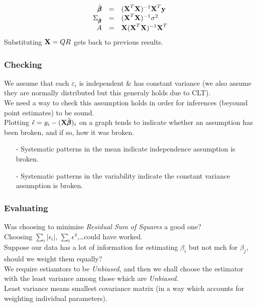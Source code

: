 \documentclass[11pt,a4paper]{article}
\begin{document}
\[\begin{array}{rcl}
\hat{\pmb\beta}&=&(\textbf{X}^T\textbf{X})^{-1}\textbf{X}^T\textbf{y}\\
\Sigma_{\hat{\pmb\beta}}&=&(\textbf{X}^T\textbf{X})^{-1}\sigma^2\\
A&=&\textbf{X}(\textbf{X}^T\textbf{X})^{-1}\textbf{X}^T
\end{array}\]
\nb Substituting $\textbf{X}=QR$ gets back to previous results.

\subsubsection{Checking}

We assume that each $\varepsilon_i$ is independent \& has constant variance (we also assume they are normally distributed but this generaly holds due to CLT).\\
We need a way to check this assumption holds in order for inferences (beyound point estimates) to be sound.\\

Plotting $\hat\epsilon=y_i-(\textbf{X}\hat{\pmb\beta})_i$ on a graph tends to indicate whether an assumption has been broken, and if so, how it was broken.
\begin{itemize}
	\item[-] Systematic patterns in the mean indicate independence assumption is broken.
	\item[-] Systematic patterns in the variability indicate the constant variance assumption is broken.
\end{itemize}

\subsubsection{Evaluating}

Was choosing to minimise \textit{Residual Sum of Squares} a good one?\\
\nb Choosing $\sum_i|\epsilon_i|$, $\sum_i\epsilon^4$,\dots could have worked.\\

Suppose our data has a lot of information for estimating $\beta_i$ but not mch for $\beta_j$, should we weight them equally?\\

We require estiamtors to be \textit{Unbiased}, and then we shall choose the estimator with the least variance among those which are \textit{Unbiased}.\\
\nb Least variance means smallest covariance matrix (in a way which accounts for weighting individual parameters).\\
\end{document}
